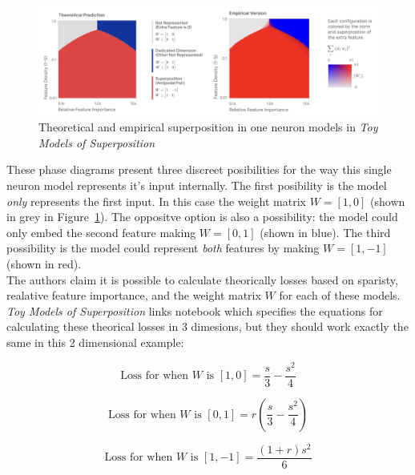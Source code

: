 \documentclass{article} %
\begin{document}
\begin{figure}[h]
    \centering
    \includegraphics[width=0.99\linewidth]{phase_changes/images/phase_changes_anthropic.png}
    \captionsetup{font=footnotesize, width=0.7\linewidth} %
    \caption{
        Theoretical and empirical superposition in one neuron models in 
        \textit{Toy Models of Superposition}\cite{elhage2022toy}
    }
    \label{fig:section4_anthropic}
\end{figure}

These phase diagrams present three discreet posibilities for the way this single
neuron model represents it's input internally. The first posibility is the model 
\textit{only} represents the first input. In this case the weight matrix $W = [1, 0]$ (shown in
grey in Figure~\ref{fig:section4_anthropic}). The oppositve option is also a 
possibility: the model could only embed the second feature making $W = [0, 1]$ 
(shown in blue). The third possibility is the model could represent \textit{both}
features by making $W = [1, -1]$ (shown in red). \\

The authors claim it is possible to calculate theorically losses based on sparisty,
realative feature importance, and the weight matrix $W$ for each of these models. 
\textit{Toy Models of Superposition} links notebook which specifies
the equations for calculating these theorical losses in 3 dimesions, but they
should work exactly the same in this 2 dimensional example:

\begin{equation}
    \label{eq:loss1}
    \text{Loss for when  $W$ is $[1, 0]$} = \frac{s}{3} - \frac{s^2}{4}
\end{equation}

\begin{equation}
    \label{eq:loss2}
    \text{Loss for when  $W$ is $[0, 1]$} = r \left(\frac{s}{3} - \frac{s^2}{4}\right)
\end{equation}

\begin{equation}
    \label{eq:loss3}
    \text{Loss for when  $W$ is $[1, -1]$} = \frac{(1 + r)s^2}{6}
\end{equation}
\end{document}

